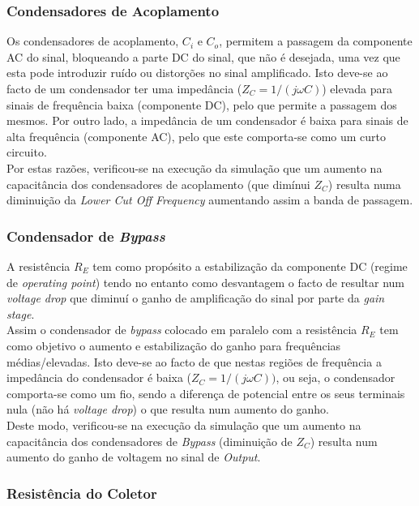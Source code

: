 \subsubsection{Condensadores de Acoplamento}

Os condensadores de acoplamento, $C_i$ e $C_o$, permitem a passagem da componente AC do sinal, bloqueando a parte DC
do sinal, que não é desejada, uma vez que esta pode  introduzir ruído ou distorções no sinal amplificado. Isto deve-se
ao facto de um condensador ter uma impedância ($Z_C = 1 / (j \omega C)$) elevada para sinais de frequência baixa
(componente DC), pelo que permite a passagem dos mesmos. Por outro lado, a impedância de um condensador é baixa para sinais de
alta frequência (componente AC), pelo que este comporta-se como um curto circuito.
\\
Por estas razões, verificou-se na execução da simulação que um aumento na capacitância dos condensadores de acoplamento (que dimínui $Z_C$)
resulta numa diminuição da \emph{Lower Cut Off Frequency} aumentando assim a banda de passagem.

\subsubsection{Condensador de \emph{Bypass}}

A resistência $R_E$ tem como propósito a estabilização da componente DC (regime de \emph{operating point}) tendo no entanto como 
desvantagem o facto de resultar num \emph{voltage drop} que diminuí o ganho de amplificação do sinal por parte da \emph{gain stage}.
\\
Assim o condensador de \emph{bypass} colocado em paralelo com a resistência $R_E$ tem como objetivo o aumento e estabilização do ganho
para frequências médias/elevadas. Isto deve-se ao facto de que nestas regiões de frequência a impedância do condensador é baixa 
($Z_C = 1/(j \omega C))$, ou seja, o condensador comporta-se como um fio, sendo a diferença de potencial entre os seus terminais nula (não há
\emph{voltage drop}) o que resulta num aumento do ganho.
\\
Deste modo, verificou-se na execução da simulação que um aumento na capacitância dos condensadores de \emph{Bypass} (diminuição de $Z_C$) 
resulta num aumento do ganho de voltagem no sinal de \emph{Output}.

\subsubsection{Resistência do Coletor}

